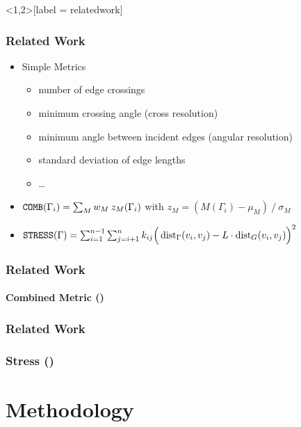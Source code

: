 \documentclass{beamer}
\begin{document}
\begin{frame}<1,2>[label = relatedwork]
  \frametitle{Related Work}
  \begin{itemize}
  \item<+-> Simple Metrics
    \begin{itemize}
    \item number of edge crossings
    \item minimum crossing angle (cross resolution)
    \item minimum angle between incident edges (angular resolution)
    \item standard deviation of edge lengths
    \item\dots
    \end{itemize}
    \bigskip
  \item<+-> %
    \( \mbox{\text{\upshape\ttfamily COMB}}(\Gamma_i) = \sum_{M} w_M \: z_{M}(\Gamma_i) \)
    \qquad with \qquad
    \( z_M = ( M(\Gamma_i) - \mu_M ) \: / \: \sigma_M \)
    \bigskip
  \item<+-> %
    \(
      \operatorname{\mbox{\text{\upshape\ttfamily STRESS}}}(\Gamma) = \sum_{i=1}^{n-1} \sum_{j=i+1}^{n} k_{ij}
      \Big( \operatorname{dist}_\Gamma(v_i,v_j) - L \cdot \operatorname{dist}_G(v_i,v_j) \Big)^2
    \)
  \end{itemize}
\end{frame}

\begin{frame}
  \frametitle{Related Work}
  \framesubtitle{Combined Metric ()}
  \ShowDemoScale{}
\end{frame}


\begin{frame}
  \frametitle{Related Work}
  \frametitle{Stress ()}
  \ShowDemoScale{}
\end{frame}

\section{Methodology}
\end{document}
